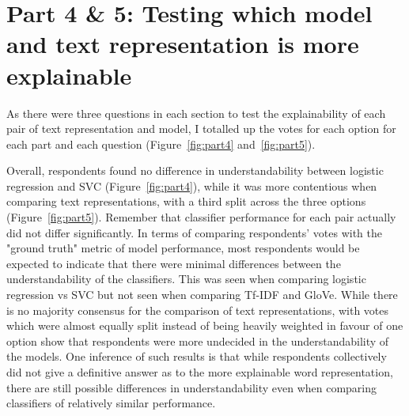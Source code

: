 \section{Part 4 \& 5: Testing which model and text representation is more explainable}
As there were three questions in each section to test the explainability of each pair of text representation and model, I totalled up the votes for each option for each part and each question (Figure~\ref{fig:part4} and~\ref{fig:part5}).

Overall, respondents found no difference in understandability between logistic regression and SVC (Figure~\ref{fig:part4}), while it was more contentious when comparing text representations, with a third split across the three options (Figure~\ref{fig:part5}). Remember that classifier performance for each pair actually did not differ significantly. In terms of comparing respondents' votes with the "ground truth" metric of model performance, most respondents would be expected to indicate that there were minimal differences between the understandability of the classifiers. This was seen when comparing logistic regression vs SVC but not seen when comparing Tf-IDF and GloVe. While there is no majority consensus for the comparison of text representations, with votes which were almost equally split instead of being heavily weighted in favour of one option show that respondents were more undecided in the understandability of the models. One inference of such results is that while respondents collectively did not give a definitive answer as to the more explainable word representation, there are still possible differences in understandability even when comparing classifiers of relatively similar performance.

